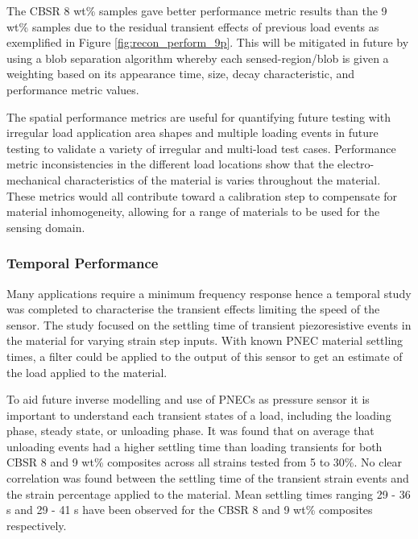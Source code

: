 The CBSR 8 wt\% samples gave better performance metric results than the 9 wt\% samples due to the residual transient effects of previous load events as exemplified in Figure \ref{fig:recon_perform_9p}. This will be mitigated in future by using a blob separation algorithm whereby each sensed-region/blob is given a weighting based on its appearance time, size, decay characteristic, and performance metric values.

The spatial performance metrics are useful for quantifying future testing with irregular load application area shapes and multiple loading events in future testing to validate a variety of irregular and multi-load test cases. Performance metric inconsistencies in the different load locations show that the electro-mechanical characteristics of the material is varies throughout the material. These metrics would all contribute toward a calibration step to compensate for material inhomogeneity, allowing for a range of materials to be used for the sensing domain.


\subsubsection{Temporal Performance}\label{sec:Temporal Performance3}
Many applications require a minimum frequency response hence a temporal study was completed to characterise the transient effects limiting the speed of the sensor. The study focused on the settling time of transient piezoresistive events in the material for varying strain step inputs. With known PNEC material settling times, a filter could be applied to the output of this sensor to get an estimate of the load applied to the material. 

To aid future inverse modelling and use of PNECs as pressure sensor it is important to understand each transient states of a load, including the loading phase, steady state, or unloading phase. It was found that on average that unloading events had a higher settling time than loading transients for both CBSR 8 and 9 wt\% composites across all strains tested from 5 to 30\%. No clear correlation was found between the settling time of the transient strain events and the strain percentage applied to the material. Mean settling times ranging 29 - 36 s and 29 - 41 s have been observed for the CBSR 8 and 9 wt\% composites respectively. 

